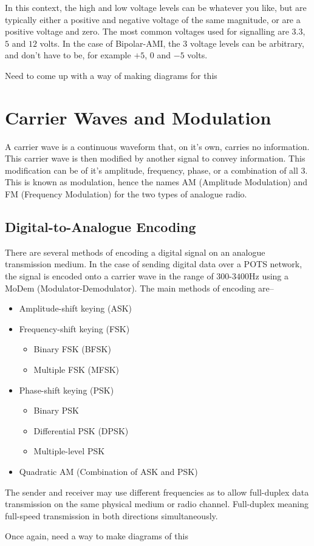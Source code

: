 In this context, the high and low voltage levels can be whatever you like, but are typically either a positive and
 negative voltage of the same magnitude, or are a positive voltage and zero. The most common voltages used for
 signalling are $3.3$, $5$ and $12$ volts. In the case of Bipolar-AMI, the 3 voltage levels can be arbitrary, and don't
 have to be, for example $+5$, $0$ and $-5$ volts.

\Huge{Need to come up with a way of making diagrams for this} 

\section*{Carrier Waves and Modulation}

A carrier wave is a continuous waveform that, on it's own, carries no information. This carrier wave is then modified
 by another signal to convey information. This modification can be of it's amplitude, frequency, phase, or a combination
 of all 3. This is known as modulation, hence the names AM (Amplitude Modulation) and FM (Frequency Modulation) for the
 two types of analogue radio.

\subsection*{Digital-to-Analogue Encoding}

There are several methods of encoding a digital signal on an analogue transmission medium. In the case of sending
 digital data over a POTS network, the signal is encoded onto a carrier wave in the range of $300$-$3400$Hz using a
 MoDem (Modulator-Demodulator). The main methods of encoding are--

\begin{itemize}
  \item Amplitude-shift keying (ASK)
  \item Frequency-shift keying (FSK)
  \begin{itemize}
    \item Binary FSK (BFSK)
    \item Multiple FSK (MFSK)
  \end{itemize}
  \item Phase-shift keying (PSK)
  \begin{itemize}
    \item Binary PSK
    \item Differential PSK (DPSK)
    \item Multiple-level PSK
  \end{itemize}
  \item Quadratic AM (Combination of ASK and PSK)
\end{itemize}

The sender and receiver may use different frequencies as to allow full-duplex data transmission on the same physical
 medium or radio channel. Full-duplex meaning full-speed transmission in both directions simultaneously.

\Huge{Once again, need a way to make diagrams of this}